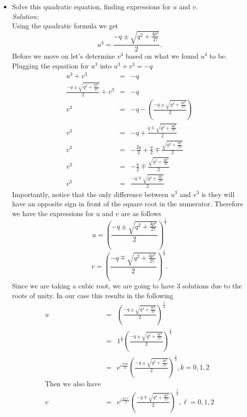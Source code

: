 \documentclass[10pt]{amsart}
\theoremstyle{nonumberplain}
\begin{document}
\begin{enumerate}[label={\bf {\arabic*}:}]
\begin{itemize}
\item Solve this quadratic equation, finding expressions for $u$ and $v$. \\
\textit{Solution:} \\
Using the quadratic formula we get
$$u^3 = \frac{-q \pm \sqrt{q^2 + \frac{4p^3}{27}}}{2}.$$
Before we move on let's determine $v^3$ based on what we found $u^3$ to be. Plugging the equation for $u^3$ into $u^3+v^3=-q$
\begin{eqnarray*}
u^3+v^3 &=& -q \\
\frac{-q \pm \sqrt{q^2 + \frac{4p^3}{27}}}{2} + v^3 &=& -q \\
v^3 &=& -q - \left(\frac{-q \pm \sqrt{q^2 + \frac{4p^3}{27}}}{2}\right) \\
v^3 &=& -q + \frac{q \mp \sqrt{q^2 + \frac{4p^3}{27}}}{2} \\
v^3 &=& -\frac{2q}{2} + \frac{q}{2} \mp \frac{\sqrt{q^2 + \frac{4p^3}{27}}}{2} \\
v^3 &=& -\frac{q}{2} \mp \frac{\sqrt{q^2 + \frac{4p^3}{27}}}{2} \\
v^3 &=& \frac{-q \mp \sqrt{q^2 + \frac{4p^3}{27}}}{2}
\end{eqnarray*}
Importantly, notice that the only difference between $u^3$ and $v^3$ is they will have an opposite sign in front of the square root in the numerator.
Therefore we have the expressions for $u$ and $v$ are as follows
$$u = \left(\frac{-q \pm \sqrt{q^2 + \frac{4p^3}{27}}}{2}\right)^{\frac{1}{3}}$$
$$v = \left(\frac{-q \mp \sqrt{q^2 + \frac{4p^3}{27}}}{2}\right)^{\frac{1}{3}}.$$
Since we are taking a cubic root, we are going to have 3 solutions due to the roots of unity. In our case this results in the following
\begin{eqnarray*}
u &=& \left(\frac{-q \pm \sqrt{q^2 + \frac{4p^3}{27}}}{2}\right)^{\frac{1}{3}} \\
   &=& 1^{\frac{1}{3}}\left(\frac{-q \pm \sqrt{q^2 + \frac{4p^3}{27}}}{2}\right)^{\frac{1}{3}} \\
   &=& e^{i\frac{2\pi k}{3}}\left(\frac{-q \pm \sqrt{q^2 + \frac{4p^3}{27}}}{2}\right)^{\frac{1}{3}}, k = 0, 1, 2 \\
\text{Then we also have} \\
v &=& e^{i\frac{2\pi \ell}{3}} \left(\frac{-q \mp \sqrt{q^2 + \frac{4p^3}{27}}}{2}\right)^{\frac{1}{3}}, \ell = 0, 1, 2
\end{eqnarray*}


\end{itemize}
\end{enumerate}
\end{document}
